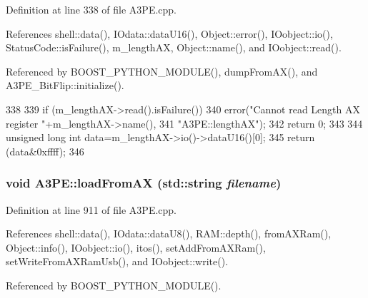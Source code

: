 Definition at line 338 of file A3PE.cpp.

References shell::data(), IOdata::dataU16(), Object::error(), IOobject::io(), StatusCode::isFailure(), m\_\-lengthAX, Object::name(), and IOobject::read().

Referenced by BOOST\_\-PYTHON\_\-MODULE(), dumpFromAX(), and A3PE\_\-BitFlip::initialize().


\begin{DoxyCode}
338                            {
339   if (m_lengthAX->read().isFailure()){
340     error("Cannot read Length AX register "+m_lengthAX->name(),
341         "A3PE::lengthAX");
342     return 0;
343   }
344   unsigned long int data=m_lengthAX->io()->dataU16()[0];
345   return (data&0xffff);
346 }
\end{DoxyCode}
\hypertarget{classA3PE_a65235f7d42e8f7fb6056f5629545d2aa}{
\subsubsection[{loadFromAX}]{\setlength{\rightskip}{0pt plus 5cm}void A3PE::loadFromAX (std::string {\em filename})}}
\label{classA3PE_a65235f7d42e8f7fb6056f5629545d2aa}


Definition at line 911 of file A3PE.cpp.

References shell::data(), IOdata::dataU8(), RAM::depth(), fromAXRam(), Object::info(), IOobject::io(), itos(), setAddFromAXRam(), setWriteFromAXRamUsb(), and IOobject::write().

Referenced by BOOST\_\-PYTHON\_\-MODULE().



